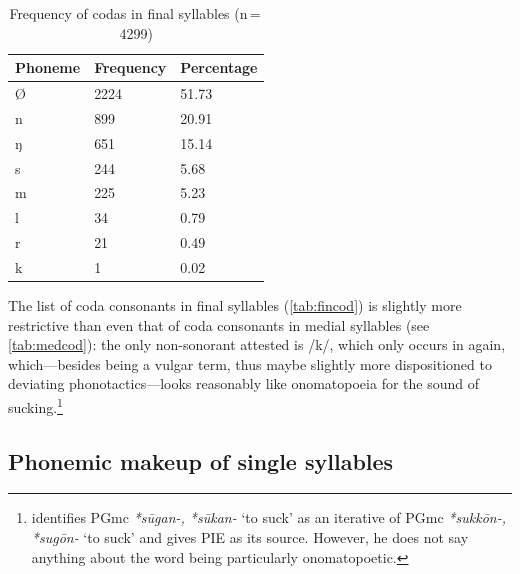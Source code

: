\begin{table}\centering
\caption[Frequency of codas in final syllables]{Frequency of codas in final 
syllables (n\,=\,4299)}
\begin{tabu} to 0.67\linewidth{X X[c] X[c]}
\tableheaderfont\toprule
Phoneme
	& Frequency
	& Percentage
	\\
	
\toprule

Ø
	& 2224
	& 51.73\pct
	\\

\midrule

n
	& 899
	& 20.91\pct
	\\

ŋ
	& 651
	& 15.14\pct
	\\

s
	& 244
	& 5.68\pct
	\\

m
	& 225
	& 5.23\pct
	\\

l
	& 34
	& 0.79\pct
	\\

r
	& 21
	& 0.49\pct
	\\

k
	& 1
	& 0.02\pct
	\\

\bottomrule
\end{tabu}
\label{tab:fincod}
\end{table}

The list of coda consonants in final syllables (\autoref{tab:fincod}) is
slightly more restrictive than even that of coda consonants in medial syllables
(see \autoref{tab:medcod}): the only non-sonorant attested is /k/, which only
occurs in  again, which---besides being a vulgar
term, thus maybe slightly more dispositioned to deviating phonotactics---looks
reasonably like onomatopoeia for the sound of
sucking.\footnote{\citet[489--490]{kroonen2013} identifies PGmc
\textit{*sūgan-, *sūkan-} `to suck' as an iterative of PGmc \textit{*sukkōn-,
*sugōn-} `to suck' and gives PIE  as its source.
However, he does not say anything about the word being particularly
onomatopoetic.}
%

\subsection{Phonemic makeup of single syllables}

